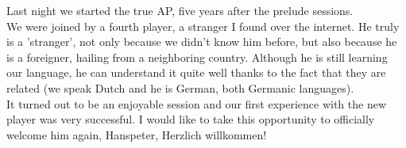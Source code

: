 Last night we started the true AP, five years after the prelude sessions.\\

We were joined by a fourth player, a stranger I found over the internet. He truly is a 'stranger', not only because we didn't know him before, but also because he is a foreigner, hailing from a neighboring country. Although he is still learning our language, he can understand it quite well thanks to the fact that they are related (we speak Dutch and he is German, both Germanic languages).\\

It turned out to be an enjoyable session and our first experience with the new player was very successful. I would like to take this opportunity to officially welcome him again, Hanspeter, Herzlich willkommen!\\

